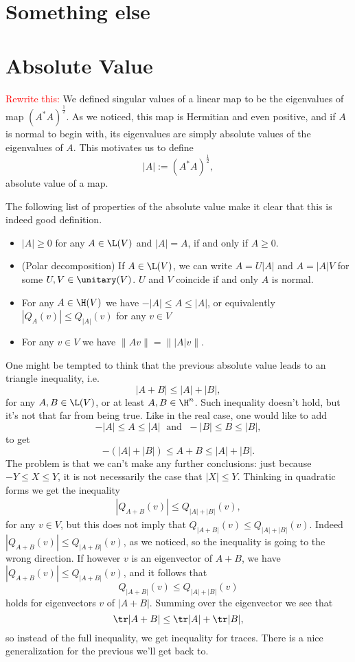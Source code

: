 \section{Something else}

\section{Absolute Value}

\textcolor{red}{Rewrite this:} We defined singular values of a linear map to be the eigenvalues of map $\left(A^{*}A\right)^{\frac{1}{2}}$. As we noticed, this map is Hermitian and even positive, and if $A$ is normal to begin with, its eigenvalues are simply absolute values of the eigenvalues of $A$. This motivates us to define
\[
	|A| := \left(A^{*}A\right)^{\frac{1}{2}},
\]
absolute value of a map.

The following list of properties of the absolute value make it clear that this is indeed good definition.

\begin{itemize}
	\item $|A| \geq 0$ for any $A \in \L(V)$ and $|A| = A$, if and only if $A \geq 0$.
	\item (Polar decomposition) If $A \in \L(V)$, we can write $A = U |A|$ and $A = |A| V$ for some $U, V \in \unitary(V)$. $U$ and $V$ coincide if and only $A$ is normal.
	\item For any $A \in \H(V)$ we have $-|A| \leq A \leq |A|$, or equivalently $|Q_{A}(v)| \leq Q_{|A|}(v)$ for any $v \in V$
	\item For any $v \in V$ we have $\|A v\| = \||A|v\|$.
\end{itemize}

One might be tempted to think that the previous absolute value leads to an triangle inequality, i.e.
\[
	|A + B| \leq |A| + |B|,
\]
for any $A, B \in \L(V)$, or at least $A, B \in \H^{n}$. Such inequality doesn't hold, but it's not that far from being true. Like in the real case, one would like to add
\[
	-|A| \leq A \leq |A| \; \text{ and } \; -|B| \leq B \leq |B|,
\]
to get
\[
	-(|A| + |B|) \leq A + B \leq |A| + |B|.
\]
The problem is that we can't make any further conclusions: just because $-Y \leq X \leq Y$, it is not necessarily the case that $|X| \leq Y$. Thinking in quadratic forms we get the inequality
\begin{align}
	|Q_{A + B}(v)| \leq Q_{|A| + |B|}(v),
\end{align}
for any $v \in V$, but this does not imply that $Q_{|A + B|}(v) \leq Q_{|A| + |B|}(v)$. Indeed $|Q_{A + B}(v)| \leq Q_{|A + B|}(v)$, as we noticed, so the inequality is going to the wrong direction. If however $v$ is an eigenvector of $A + B$, we have $|Q_{A + B}(v)| \leq Q_{|A + B|}(v)$, and it follows that
\[
	Q_{|A + B|}(v) \leq Q_{|A| + |B|}(v)
\]
holds for eigenvectors $v$ of $|A + B|$. Summing over the eigenvector we see that
\[
	\tr|A + B| \leq \tr |A| + \tr |B|,
\]
so instead of the full inequality, we get inequality for traces. There is a nice generalization for the previous we'll get back to.

